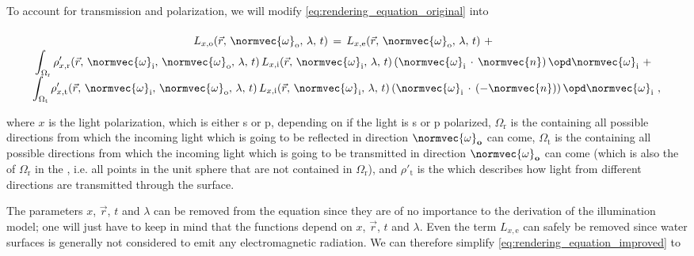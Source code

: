 To account for transmission and polarization, we will modify \eqref{eq:rendering_equation_original} into

\begin{equation} \label{eq:rendering_equation_improved}
\renewcommand*{\arraystretch}{1.5}
\begin{array}{cl}
L_{x,\text{o}}(\vec{r},\,\normvec{\omega}_{\text{o}},\, \lambda,\, t) \,=\, L_{x,\text{e}}(\vec{r},\, \normvec{\omega}_{\text{o}},\, \lambda,\, t) \ + \\
\displaystyle \int_{\Omega_{\text{r}}} \rho'_{x,\text{r}}(\vec{r},\, \normvec{\omega}_{\text{i}},\, \normvec{\omega}_{\text{o}},\, \lambda,\, t)\, L_{x,\text{i}}(\vec{r},\, \normvec{\omega}_{\text{i}},\, \lambda,\, t)\, (\normvec{\omega}_{\text{i}}\,\cdot\,\normvec{n})\, \opd \normvec{\omega}_{\text{i}} \ + \\
\displaystyle \int_{\Omega_{\text{t}}} \rho'_{x,\text{t}}(\vec{r},\, \normvec{\omega}_{\text{i}},\, \normvec{\omega}_{\text{o}},\, \lambda,\, t)\, L_{x,\text{i}}(\vec{r},\, \normvec{\omega}_{\text{i}},\, \lambda,\, t)\, (\normvec{\omega}_{\text{i}}\,\cdot\,(-\normvec{n}))\, \opd \normvec{\omega}_{\text{i}} & \!\!\!\! ,
\end{array}
\end{equation}

where $x$ is the light polarization, which is either s or p, depending on if the light is s or p polarized, $\Omega_{\text{r}}$ is the  containing all possible directions from which the incoming light which is going to be reflected in direction $\normvec{\omega}_{\textbf{o}}$ can come, $\Omega_{\text{t}}$ is the  containing all possible directions from which the incoming light which is going to be transmitted in direction $\normvec{\omega}_{\textbf{o}}$ can come (which is also the  of $\Omega_{\text{r}}$ in the , i.e. all points in the unit sphere that are not contained in $\Omega_{\text{r}}$), and $\rho'_{\text{t}}$ is the \BTDF which describes how light from different directions are transmitted through the surface.

The parameters $x$, $\vec{r}$, $t$ and $\lambda$ can be removed from the equation since they are of no importance to the derivation of the illumination model; one will just have to keep in mind that the functions depend on $x$, $\vec{r}$, $t$ and $\lambda$. Even the term $L_{x, \text{e}}$ can safely be removed since water surfaces is generally not considered to emit any electromagnetic radiation. We can therefore simplify \eqref{eq:rendering_equation_improved} to

